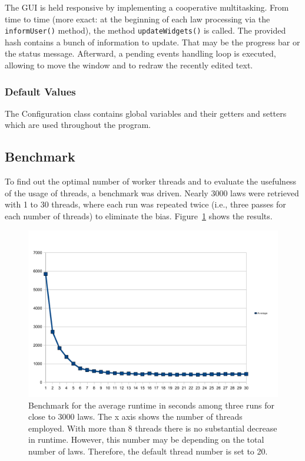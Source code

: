 \documentclass{scrartcl}
\begin{document}
The GUI is held responsive by implementing a cooperative multitasking. From time to time (more exact: at the beginning of each law processing via the \texttt{informUser()} method), the method \texttt{updateWidgets()} is called. The provided hash contains a bunch of information to update. That may be the progress bar or the status message. Afterward, a pending events handling loop is executed, allowing to move the window and to redraw the recently edited text.

\subsubsection{Default Values}
The Configuration class contains global variables and their getters and setters which are used throughout the program.


\subsection{Benchmark}
To find out the optimal number of worker threads and to evaluate the usefulness of the usage of threads, a benchmark was driven. Nearly 3000 laws were retrieved with 1 to 30 threads, where each run was repeated twice (i.e., three passes for each number of threads) to eliminate the bias. Figure~\ref{fig:benchmark} shows the results.

\begin{figure}[ht]
\begin{center}
\includegraphics[width = \textwidth]{benchmark}
\caption{Benchmark for the average runtime in seconds among three runs for close to 3000 laws. The x axis shows the number of threads employed. With more than 8 threads there is no substantial decrease in runtime. However, this number may be depending on the total number of laws. Therefore, the default thread number is set to 20.}
\label{fig:benchmark}
\end{center}
\end{figure}
\end{document}
